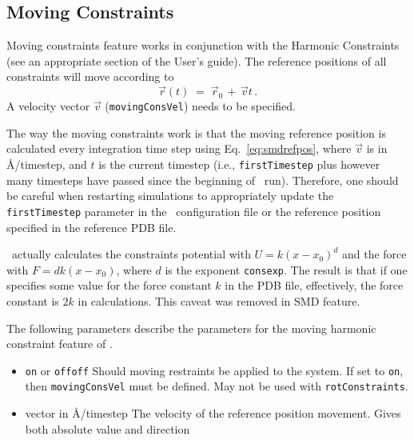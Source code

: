 \subsection{Moving Constraints}

Moving constraints feature works in conjunction with the Harmonic
Constraints (see an appropriate section of the User's guide).
The reference positions of all constraints
will move according to
\begin{equation}
\label{eq:smdrefpos}
   \vec r(t) \; = \; \vec r_0 \, + \, \vec v t \,.
\end{equation}
A velocity vector $\vec v$ ({\tt movingConsVel}) needs to be specified.

The way the moving constraints work is that the moving reference
position is calculated every integration time step using
Eq.~\ref{eq:smdrefpos}, where $\vec v$ is in \AA/timestep, and $t$ is the
current timestep (i.e., {\tt firstTimestep} plus however many
timesteps have passed since the beginning of \NAMD\ run). Therefore,
one should be careful when restarting simulations to appropriately
update the {\tt firstTimestep} parameter in the \NAMD\ configuration
file or the reference position specified in the reference PDB file.

 \NAMD\ actually calculates the constraints
potential with $U = k (x-x_0)^d$ and the force with $F = d k (x-x_0)$,
where $d$ is the exponent {\tt consexp}. The result is that if one
specifies some value for the force constant $k$ in the PDB file,
effectively, the force constant is $2 k$ in calculations. This caveat
was removed in SMD feature.

The following parameters describe the parameters for the
moving harmonic constraint feature of \NAMD.

\begin{itemize}

\item
{}
{{\tt on} or {\tt off}}{{\tt off}}
{Should moving restraints be applied to the system. If set
to {\tt on}, then  {\tt movingConsVel} must be defined.
May not be used with {\tt rotConstraints}.}

\item
{}
{vector in \AA/timestep}
{The velocity of the reference position movement. Gives both absolute
value and direction}

\end{itemize}

